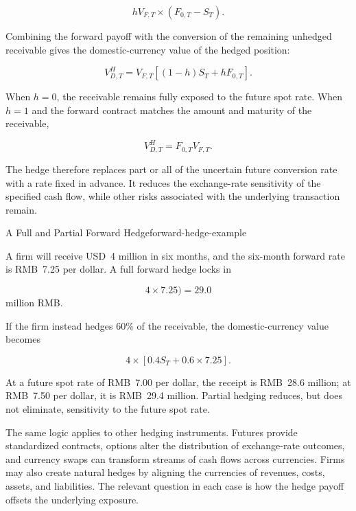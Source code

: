 \begin{equation}
hV_{F,T}\times(F_{0,T}-S_T).
\label{eq:ch10-export-forward-payoff}
\end{equation}

Combining the forward payoff with the conversion
of the remaining unhedged receivable gives the
domestic-currency value of the hedged position:

\begin{equation}
V_{D,T}^{H}
=
V_{F,T}\left[(1-h)S_T+hF_{0,T}\right].
\label{eq:ch10-partial-forward-hedge}
\end{equation}

When $h=0$, the receivable remains fully exposed
to the future spot rate. When $h=1$ and the
forward contract matches the amount and maturity
of the receivable,

\begin{equation}
V_{D,T}^{H}=F_{0,T}V_{F,T}.
\label{eq:ch10-full-forward-hedge}
\end{equation}

The hedge therefore replaces part or all of the
uncertain future conversion rate with a rate
fixed in advance. It reduces the exchange-rate
sensitivity of the specified cash flow, while
other risks associated with the underlying
transaction remain.

\begin{example}{A Full and Partial Forward Hedge}{forward-hedge-example}

A firm will receive USD~4 million in six months, and the six-month forward rate is RMB~7.25 per dollar. A full forward hedge locks in

$$
4\times 7.25)=29.0
$$
million RMB.

If the firm instead hedges 60\% of the receivable, the domestic-currency value becomes

$$
4\times\left[0.4S_T+0.6\times 7.25\right].
$$

At a future spot rate of RMB~7.00 per dollar, the receipt is RMB~28.6 million; at RMB~7.50 per dollar, it is RMB~29.4 million. Partial hedging reduces, but does not eliminate, sensitivity to the future spot rate.

\end{example}

The same logic applies to other hedging instruments. Futures provide standardized contracts, options alter the distribution of exchange-rate outcomes, and currency swaps can transform streams of cash flows across currencies. Firms may also create natural hedges by aligning the currencies of revenues, costs, assets, and liabilities. The relevant question in each case is how the hedge payoff offsets the underlying exposure.

